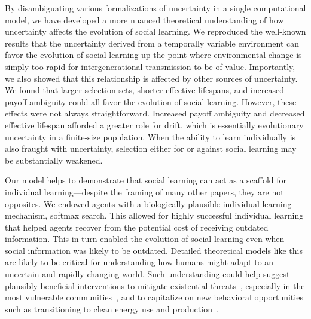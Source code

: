 \documentclass[letterpaper,11.5pt]{scrartcl}
\begin{document}
By disambiguating various formalizations of uncertainty in a single computational model, we have developed a more nuanced theoretical understanding of how uncertainty affects the evolution of social learning.
We reproduced the well-known results that the uncertainty derived from a temporally variable environment can favor the evolution of social learning up the point where environmental change is simply too rapid for intergenerational transmission to be of value. Importantly, we also showed that this relationship is affected by other sources of uncertainty. 
We found that larger selection sets, shorter effective lifespans, and increased payoff ambiguity could all favor the evolution of social learning. However, these effects were not always straightforward. 
Increased payoff ambiguity and decreased effective lifespan afforded a greater role for drift, which is essentially
evolutionary uncertainty in a finite-size population. When the ability to learn individually is also fraught with uncertainty, selection either for or against social learning may be substantially weakened. 

Our model helps to demonstrate that social learning can act as a scaffold for individual learning---despite the framing of many other papers, they are not opposites. 
We endowed agents with a biologically-plausible individual learning mechanism, softmax search. This allowed for highly successful individual learning that helped agents recover from the potential cost of receiving outdated information. This in turn enabled the evolution of social learning 
even when social information was likely to be outdated. 
Detailed theoretical models like this are likely to be critical for understanding how humans might adapt to an uncertain and rapidly changing world.
Such understanding could help suggest plausibly beneficial interventions to mitigate existential threats~\cite{Moya2020,Jones2021}, especially in
the most vulnerable communities~\cite{McNamara2020}, and to capitalize on new behavioral opportunities such as transitioning to clean energy use and
production~\cite{NatureEnergyEditorialPromisesPremises2018,Brisbois2022}.
\end{document}
